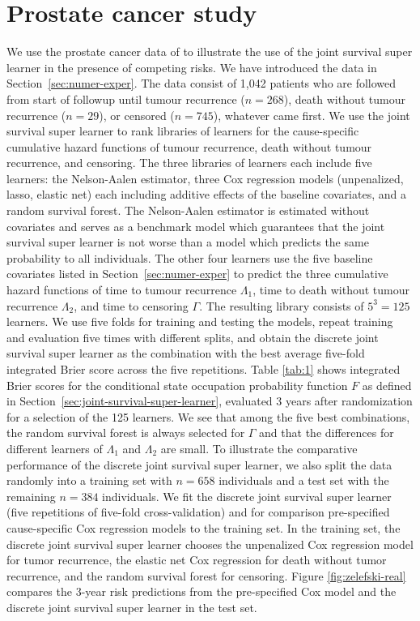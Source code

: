 \documentclass[alpha-refs]{wiley-article}
\newcommand{\1}{\mathds{1}}
\begin{document}
\section{Prostate cancer study}
\label{sec:real-data-appl}

We use the prostate cancer data of \cite{kattan2000pretreatment} to
illustrate the use of the joint survival super learner in the presence
of competing risks. We have introduced the data in
Section~\ref{sec:numer-exper}. The data consist of 1,042 patients who
are followed from start of followup until tumour recurrence ($n=268$),
death without tumour recurrence ($n=29$), or censored ($n=745$),
whatever came first. We use the joint survival super learner to rank
libraries of learners for the cause-specific cumulative hazard
functions of tumour recurrence, death without tumour recurrence, and
censoring. The three libraries of learners each include five learners:
the Nelson-Aalen estimator, three Cox regression models (unpenalized,
lasso, elastic net) each including additive effects of the baseline
covariates, and a random survival forest. The Nelson-Aalen estimator
is estimated without covariates and serves as a benchmark model which
guarantees that the joint survival super learner is not worse than a
model which predicts the same probability to all individuals. The
other four learners use the five baseline covariates listed in
Section~\ref{sec:numer-exper} to predict the three cumulative hazard
functions of time to tumour recurrence \( \Lambda_1 \), time to death
without tumour recurrence \( \Lambda_2 \), and time to censoring
$\Gamma$. The resulting library consists of \( 5^3 = 125 \)
learners. We use five folds for training and testing the models,
repeat training and evaluation five times with different splits, and
obtain the discrete joint survival super learner as the combination
with the best average five-fold integrated Brier score across the five
repetitions. Table \ref{tab:1} shows integrated Brier scores for the
conditional state occupation probability function \( F \) as defined
in Section~\ref{sec:joint-survival-super-learner}, evaluated 3 years
after randomization for a selection of the 125 learners. We see that
among the five best combinations, the random survival forest is always
selected for \(\Gamma\) and that the differences for different
learners of \(\Lambda_1\) and \(\Lambda_2\) are small. To illustrate
the comparative performance of the discrete joint survival super
learner, we also split the data randomly into a training set with
\(n=658\) individuals and a test set with the remaining \(n=384\)
individuals.  We fit the discrete joint survival super learner (five
repetitions of five-fold cross-validation) and for comparison
pre-specified cause-specific Cox regression models to the training
set. In the training set, the discrete joint survival super learner
chooses the unpenalized Cox regression model for tumor recurrence, the
elastic net Cox regression for death without tumor recurrence, and the
random survival forest for censoring. Figure \ref{fig:zelefski-real}
compares the 3-year risk predictions from the pre-specified Cox model
and the discrete joint survival super learner in the test set.
\end{document}
